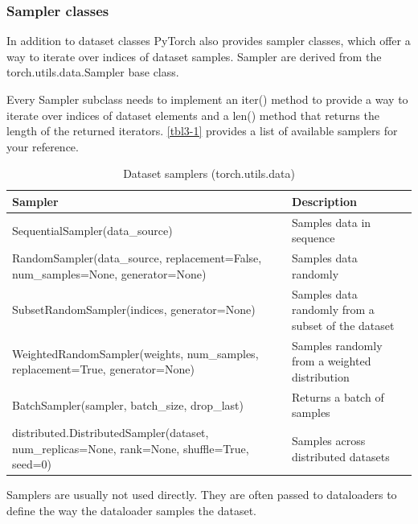 \subsubsection{Sampler classes}
In addition to dataset classes PyTorch also provides sampler
classes, which offer a way to iterate over indices of dataset samples. Sampler are derived from the torch.utils.data.Sampler base class.

Every Sampler subclass needs to implement an iter() method
to provide a way to iterate over indices of dataset elements and
a len() method that returns the length of the returned iterators. \autoref{tbl3-1} provides a list of available samplers for your reference.

\begin{table}
    \centering
    \caption{Dataset samplers (torch.utils.data)}
    \label{tbl3-1}
    \begin{tabularx}{\textwidth}{XX}
        \hline
        Sampler                                                                                      & Description                                        \\
        \hline
        SequentialSampler(data\_source)                                                              & Samples data in sequence                           \\
        RandomSampler(data\_source, replacement=False, num\_samples=None, generator=None)            & Samples data randomly                              \\
        SubsetRandomSampler(indices, generator=None)                                                 & Samples data randomly from a subset of the dataset \\
        WeightedRandomSampler(weights, num\_samples, replacement=True, generator=None)               & Samples randomly from a weighted distribution      \\
        BatchSampler(sampler, batch\_size, drop\_last)                                               & Returns a batch of samples                         \\
        distributed.DistributedSampler(dataset, num\_replicas=None, rank=None, shuffle=True, seed=0) & Samples across distributed datasets                \\
        \hline
    \end{tabularx}
\end{table}

Samplers are usually not used directly. They are often passed to
dataloaders to define the way the dataloader samples the
dataset.

